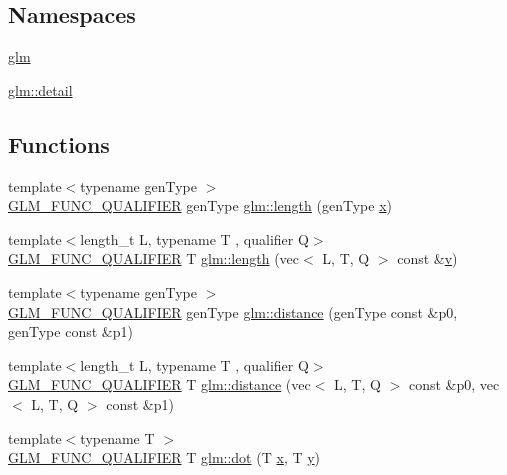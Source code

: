 \subsection*{Namespaces}
\begin{DoxyCompactItemize}
\item 
 \mbox{\hyperlink{namespaceglm}{glm}}
\item 
 \mbox{\hyperlink{namespaceglm_1_1detail}{glm\+::detail}}
\end{DoxyCompactItemize}
\subsection*{Functions}
\begin{DoxyCompactItemize}
\item 
{\footnotesize template$<$typename gen\+Type $>$ }\\\mbox{\hyperlink{setup_8hpp_a33fdea6f91c5f834105f7415e2a64407}{G\+L\+M\+\_\+\+F\+U\+N\+C\+\_\+\+Q\+U\+A\+L\+I\+F\+I\+ER}} gen\+Type \mbox{\hyperlink{namespaceglm_abcd8538aa95a8963803ec42c2fd654cd}{glm\+::length}} (gen\+Type \mbox{\hyperlink{_s_d_l__opengl_8h_ad0e63d0edcdbd3d79554076bf309fd47}{x}})
\item 
{\footnotesize template$<$length\+\_\+t L, typename T , qualifier Q$>$ }\\\mbox{\hyperlink{setup_8hpp_a33fdea6f91c5f834105f7415e2a64407}{G\+L\+M\+\_\+\+F\+U\+N\+C\+\_\+\+Q\+U\+A\+L\+I\+F\+I\+ER}} T \mbox{\hyperlink{group__core__func__geometric_ga0cdabbb000834d994a1d6dc56f8f5263}{glm\+::length}} (vec$<$ L, T, Q $>$ const \&\mbox{\hyperlink{_s_d_l__opengl_8h_a10a82eabcb59d2fcd74acee063775f90}{v}})
\item 
{\footnotesize template$<$typename gen\+Type $>$ }\\\mbox{\hyperlink{setup_8hpp_a33fdea6f91c5f834105f7415e2a64407}{G\+L\+M\+\_\+\+F\+U\+N\+C\+\_\+\+Q\+U\+A\+L\+I\+F\+I\+ER}} gen\+Type \mbox{\hyperlink{namespaceglm_aa7275be4cec4bfcf1c4a7add8f3ee7f4}{glm\+::distance}} (gen\+Type const \&p0, gen\+Type const \&p1)
\item 
{\footnotesize template$<$length\+\_\+t L, typename T , qualifier Q$>$ }\\\mbox{\hyperlink{setup_8hpp_a33fdea6f91c5f834105f7415e2a64407}{G\+L\+M\+\_\+\+F\+U\+N\+C\+\_\+\+Q\+U\+A\+L\+I\+F\+I\+ER}} T \mbox{\hyperlink{group__core__func__geometric_gaa68de6c53e20dfb2dac2d20197562e3f}{glm\+::distance}} (vec$<$ L, T, Q $>$ const \&p0, vec$<$ L, T, Q $>$ const \&p1)
\item 
{\footnotesize template$<$typename T $>$ }\\\mbox{\hyperlink{setup_8hpp_a33fdea6f91c5f834105f7415e2a64407}{G\+L\+M\+\_\+\+F\+U\+N\+C\+\_\+\+Q\+U\+A\+L\+I\+F\+I\+ER}} T \mbox{\hyperlink{namespaceglm_a40370edb74dec9048258c063b9c091c9}{glm\+::dot}} (T \mbox{\hyperlink{_s_d_l__opengl_8h_ad0e63d0edcdbd3d79554076bf309fd47}{x}}, T \mbox{\hyperlink{_s_d_l__opengl_8h_a1675d9d7bb68e1657ff028643b4037e3}{y}})

\end{DoxyCompactItemize}
